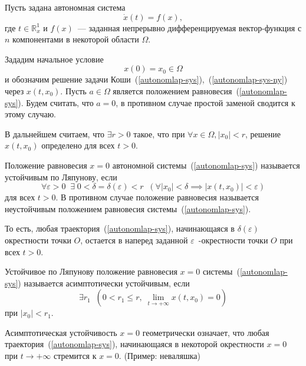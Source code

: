 \setcounter{equation}{0}

Пусть задана автономная система 
\begin{equation}\label{autonomlap-sys}
    \dot{x}(t) = f(x), 
\end{equation}
где $t \in \mathbb{R}^1_x$ и $f(x)$~--- заданная непрерывно дифференцируемая вектор-функция с $n$ компонентами в некоторой области $\Omega$.

Зададим начальное условие 
\begin{equation}\label{autonomlap-sys-ny}
    x(0) = x_0 \in \Omega
\end{equation}
и обозначим решение задачи Коши~(\ref{autonomlap-sys}),~(\ref{autonomlap-sys-ny}) через $x(t, x_0)$. Пусть $a \in \Omega$ является положением равновесия~(\ref{autonomlap-sys}). Будем считать, что $a = 0$, в противном случае простой заменой сводится к этому случаю.

В дальнейшем считаем, что $\exists r > 0$ такое, что при $\forall x \in \Omega, |x_0| < r$, решение $x(t, x_0)$ определено для всех $t > 0$.

\begin{definition}
Положение равновесия $x = 0$ автономной системы~(\ref{autonomlap-sys}) называется устойчивым по Ляпунову, если 
\[
\forall \varepsilon > 0 \;\; \exists \; 0 < \delta = \delta(\varepsilon) < r \;\;\left(\forall |x_0| < \delta \implies |x(t, x_0)| < \varepsilon \right)
\]
для всех $t > 0$.
В противном случае положение равновесия называется неустойчивым положением равновесия системы~(\ref{autonomlap-sys}).
\end{definition}

То есть, любая траектория~(\ref{autonomlap-sys}), начинающаяся в $\delta(\varepsilon)$ окрестности точки $O$, остается в наперед заданной $\varepsilon$~-окрестности точки $O$ при всех $t > 0$.

\begin{definition}
Устойчивое по Ляпунову положение равновесия $x = 0$ системы~(\ref{autonomlap-sys}) называется асимптотически устойчивым, если
\[
\exists r_1 \;\; \left(0 < r_1 \leq r,\; \lim_{t \rightarrow +\infty}x(t, x_0) = 0\right)
\]
при $|x_0| < r_1$.
\end{definition}

Асимптотическая устойчивость $x = 0$ геометрически означает, что любая траектория~(\ref{autonomlap-sys}), начинающаяся в некоторой окрестности $x = 0$ при $t \rightarrow +\infty$ стремится к $x = 0$. (Пример: неваляшка)

